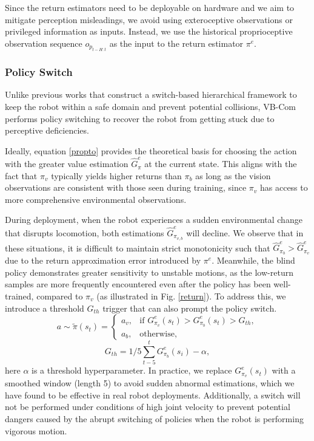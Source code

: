 Since the return estimators need to be deployable on hardware and we aim to mitigate perception misleadings, we avoid using exteroceptive observations or privileged information as inputs. Instead, we use the historical proprioceptive observation sequence $o_{p_{t-H:t}}$ as the input to the return estimator $\pi^e$.

\subsubsection{Policy Switch}
Unlike previous works that construct a switch-based hierarchical framework to keep the robot within a safe domain and prevent potential collisions, VB-Com performs policy switching to recover the robot from getting stuck due to perceptive deficiencies.

Ideally, equation \ref{propto} provides the theoretical basis for choosing the action with the greater value estimation $\hat{G}_\pi^e$ at the current state. This aligns with the fact that $\pi_v$ typically yields higher returns than $\pi_b$ as long as the vision observations are consistent with those seen during training, since $\pi_v$ has access to more comprehensive environmental observations.

During deployment, when the robot experiences a sudden environmental change that disrupts locomotion, both estimations $\hat{G}_{\pi_{v,b}}^e$ will decline. We observe that in these situations, it is difficult to maintain strict monotonicity such that $\hat{G}^e_{\pi_b} > \hat{G}^e_{\pi_v}$ due to the return approximation error introduced by $\pi^e$. Meanwhile, the blind policy demonstrates greater sensitivity to unstable motions, as the low-return samples are more frequently encountered even after the policy has been well-trained, compared to $\pi_v$ (as illustrated in Fig. \ref{return}). To address this, we introduce a threshold $G_{th}$ trigger that can also prompt the policy switch.
\begin{equation}
a \sim \tilde{\pi}(s_t) = \left\{
\begin{array}{ll}
a_v, & \text{if } G^e_{\pi_v}(s_t) > G^e_{\pi_b}(s_t)> G_{th} , \\
a_b, & \text{otherwise,}
\end{array}
\right.
\end{equation}
\begin{equation}
G_{th} =  1/5\sum_{t-5}^{t}{G_{\pi_b}^e(s_i)} - \alpha, 
\end{equation}
here $\alpha$ is a threshold hyperparameter. In practice, we replace $G^e_{\pi_v}(s_t)$ with a smoothed window (length 5) to avoid sudden abnormal estimations, which we have found to be effective in real robot deployments. Additionally, a switch will not be performed under conditions of high joint velocity to prevent potential dangers caused by the abrupt switching of policies when the robot is performing vigorous motion.


